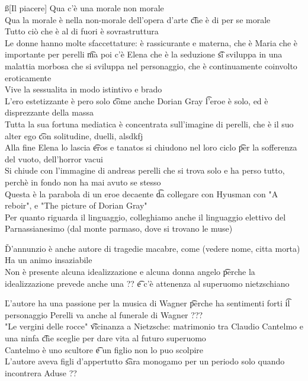 \documentclass[12pt]{article}
\begin{document}
\ss[Il piacere]
Qua c'è una morale non morale \\
Qua la morale è nella non-morale dell'opera d'arte \t che è di per se morale \\
Tutto ciò che è al di fuori è sovrastruttura \\
Le donne hanno molte sfaccettature: è rassicurante e materna, che è Maria che è importante per perelli \t ma poi c'è Elena che è la seduzione \t si sviluppa in una malattia morbosa che si sviluppa nel personaggio, che è continuamente coinvolto eroticamente \\
Vive la sessualita in modo istintivo e brado \\
L'ero estetizzante è pero solo \t come anche Dorian Gray \t l'eroe è solo, ed è disprezzante della massa \\
Tutta la sua fortuna mediatica è concentrata sull'imagine di perelli, che è il suo alter ego \t con solitudine, duelli, alsdkfj \\
Alla fine Elena lo lascia \t eros e tanatos si chiudono nel loro ciclo \t per la sofferenza del vuoto, dell'horror vacui \\
Si chiude con l'immagine di andreas perelli che si trova solo e ha perso tutto, perchè in fondo non ha mai avuto se stesso \\
Questa è la parabola di un eroe decaente \t da collegare con Hyusman con "A reboir", e "The picture of Dorian Gray" \\
Per quanto riguarda il linguaggio, colleghiamo anche il linguaggio elettivo del Parnassianesimo (dal monte parmaso, dove si trovano le muse)

\v

D'annunzio è anche autore di tragedie macabre, come (vedere nome, citta morta) \\
Ha un animo insaziabile \\
Non è presente alcuna idealizzazione e alcuna donna angelo \t perche la idealizzazione prevede anche una ?? \t e c'è attenenza al superuomo nietzschiano

\v

L'autore ha una passione per la musica di Wagner \t perche ha sentimenti forti \t il personaggio Perelli va anche al funerale di Wagner ??? \\
"Le vergini delle rocce" \t vicinanza a Nietzsche: matrimonio tra Claudio Cantelmo e una ninfa \t che sceglie per dare vita al futuro superuomo \\
Cantelmo è uno scultore \t e un figlio non lo puo scolpire \\
L'autore aveva figli d'appertutto \t sara monogamo per un periodo solo quando incontrera Aduse ??
\end{document}
